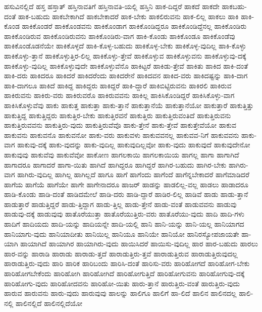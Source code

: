 {ಹಸುವಿನಲ್ಲಿದೆ
ಹಸ್ತ
ಹಸ್ತಾತ್
ಹಸ್ತಿನಾವತಿಗೆ
ಹಸ್ತಿನಾವತಿ-ಯಲ್ಲಿ
ಹಸ್ತಿನಿ
ಹಾಕ-ದಿದ್ದರೆ
ಹಾಕದೆ
ಹಾಕದೇ
ಹಾಕಬಹು-ದಂತೆ
ಹಾಕ-ಬಹುದು
ಹಾಕಬೇಕಾಗಿದೆ
ಹಾಕಬೇಕಾದರೆ
ಹಾಕ-ಬೇಕು
ಹಾಕಲಿರುವನು
ಹಾಕ-ಲಿಲ್ಲ
ಹಾಕಲು
ಹಾಕಿ
ಹಾಕಿ-ಕೊಂಡ
ಹಾಕಿಕೊಂಡರೆ
ಹಾಕಿಕೊಂಡವನು
ಹಾಕಿಕೊಂಡಾಗ
ಹಾಕಿಕೊಂಡಿದ್ದರೂ
ಹಾಕಿಕೊಂಡಿದ್ದೆನಲ್ಲ
ಹಾಕಿಕೊಂಡಿರು
ಹಾಕಿಕೊಂಡಿರುವ
ಹಾಕಿಕೊಂಡಿರುವನು
ಹಾಕಿಕೊಂಡಿರು-ವಾಗ
ಹಾಕಿ-ಕೊಂಡು
ಹಾಕಿಕೊಂಡೂ
ಹಾಕಿಕೊಂಡೆವು
ಹಾಕಿಕೊಂಡೊಡನೆಯೇ
ಹಾಕಿಕೊಳ್ಳದೆ
ಹಾಕಿ-ಕೊಳ್ಳ-ಬಹುದು
ಹಾಕಿಕೊಳ್ಳ-ಬೇಕು
ಹಾಕಿಕೊಳ್ಳ-ವುದಿಲ್ಲ
ಹಾಕಿ-ಕೊಳ್ಳು
ಹಾಕಿಕೊಳ್ಳು-ತ್ತಾನೆ
ಹಾಕಿಕೊಳ್ಳುತ್ತಿರ-ಲಿಲ್ಲ
ಹಾಕಿಕೊಳ್ಳು-ತ್ತೇವೆ
ಹಾಕಿಕೊಳ್ಳುವ
ಹಾಕಿಕೊಳ್ಳುವನು
ಹಾಕಿಕೊಳ್ಳುವು-ದಕ್ಕೆ
ಹಾಕಿಕೊಳ್ಳು-ವುದಿಲ್ಲ
ಹಾಕಿಕೊಳ್ಳುವುದೇ
ಹಾಕಿಕೊಳ್ಳುವೆನೊ
ಹಾಕಿಟ್ಟರೆ
ಹಾಕಿಡು-ತ್ತೇವೆ
ಹಾಕಿತು
ಹಾಕಿದ
ಹಾಕಿ-ದಂತೆ
ಹಾಕಿ-ದರು
ಹಾಕಿದರೂ
ಹಾಕಿದರೆ
ಹಾಕಿದರೆಂದು
ಹಾಕಿದರೇನೆ
ಹಾಕಿದವನ
ಹಾಕಿದ-ವರು
ಹಾಕಿದಷ್ಟನ್ನು
ಹಾಕಿ-ದಾಗ
ಹಾಕಿ-ದಾಗಲೂ
ಹಾಕಿದೆ
ಹಾಕಿದ್ದ
ಹಾಕಿದ್ದರು
ಹಾಕಿದ್ದರೆ
ಹಾಕಿ-ದ್ದಾರೆ
ಹಾಕಿಬಿಟ್ಟಿರುವನು
ಹಾಕಿರಲಿ
ಹಾಕಿರುವ
ಹಾಕಿರುವನು
ಹಾಕಿರು-ವರು
ಹಾಕಿರುವರೊ
ಹಾಕಿರುವವನು
ಹಾಕಿಲ್ಲ
ಹಾಕಿಸಿಕೊಂಡಿದ್ದರೆ
ಹಾಕಿಸಿಕೊಳ್ಳು-ವಾಗ
ಹಾಕಿಸಿಕೊಳ್ಳುವೆವು
ಹಾಕು
ಹಾಕುತ್ತ
ಹಾಕುತ್ತಾ
ಹಾಕು-ತ್ತಾನೆ
ಹಾಕುತ್ತಾನೆಯೆ
ಹಾಕುತ್ತಾನೆಯೋ
ಹಾಕುತ್ತಾರೆ
ಹಾಕುತ್ತಿತ್ತು
ಹಾಕುತ್ತಿದ್ದ
ಹಾಕುತ್ತಿದ್ದರು
ಹಾಕುತ್ತಿರ-ಬೇಕು
ಹಾಕುತ್ತಿರವನೆ
ಹಾಕುತ್ತಿರು
ಹಾಕುತ್ತಿರುವಂತಿದೆ
ಹಾಕುತ್ತಿರುವನು
ಹಾಕುತ್ತಿರುವವನು
ಹಾಕುತ್ತಿರು-ವುದು
ಹಾಕುತ್ತಿರುವೆವೊ
ಹಾಕು-ತ್ತೇನೆ
ಹಾಕು-ತ್ತೇವೆ
ಹಾಕುತ್ತೇವೆಯೋ
ಹಾಕುವ
ಹಾಕುವನು
ಹಾಕುವನೊ
ಹಾಕುವನೋ
ಹಾಕು-ವರು
ಹಾಕುವಳು
ಹಾಕುವವನಲ್ಲ
ಹಾಕುವವ-ನಿಗೆ
ಹಾಕುವವನು
ಹಾಕು-ವಾಗ
ಹಾಕುವು-ದಕ್ಕೆ
ಹಾಕು-ವುದನ್ನು
ಹಾಕು-ವುದಿಲ್ಲ
ಹಾಕುವುದಿಲ್ಲವೋ
ಹಾಕು-ವುದು
ಹಾಕುವುದೆ
ಹಾಕುವುದೇನೋ
ಹಾಕುವುವು
ಹಾಕುವೆವು
ಹಾಕುವೆವೋ
ಹಾಕೋಣ
ಹಾಗಲಕಾಯಿ
ಹಾಗಲಕಾಯಿಯ
ಹಾಗಲ್ಲ
ಹಾಗಾ
ಹಾಗಾಗಿದೆ
ಹಾಗಾದರೂ
ಹಾಗಾದರೆ
ಹಾಗಾ-ಯಿತು
ಹಾಗಿದೆ
ಹಾಗಿದ್ದರೂ
ಹಾಗಿದ್ದರೆ
ಹಾಗಿರ-ಬಹುದು
ಹಾಗಿರ-ಬೇಕು
ಹಾಗಿರು-ವಾಗ
ಹಾಗಿರು-ವುದಿಲ್ಲ
ಹಾಗಿಲ್ಲ
ಹಾಗಿಲ್ಲದೆ
ಹಾಗೂ
ಹಾಗೆ
ಹಾಗೆಂದು
ಹಾಗೆಂದೆ
ಹಾಗೆನ್ನಬೇಕಾದರೆ
ಹಾಗೆಮಾಡಿದರೆ
ಹಾಗೆಯ
ಹಾಗೆಯೆ
ಹಾಗೆಯೇ
ಹಾಗೇ
ಹಾಗೇನಾದರೂ
ಹಾಜರ್
ಹಾಡನ್ನು
ಹಾಡಲಿಲ್ಲ-ವಲ್ಲ
ಹಾಡಲು
ಹಾಡಾದರೂ
ಹಾಡಿ-ಕೊಂಡು
ಹಾಡಿ-ದಂತೆ
ಹಾಡಿದಮೇಲೆ
ಹಾಡಿ-ದರು
ಹಾಡಿ-ದ್ದಾರೆ
ಹಾಡಿರ-ಲಿಲ್ಲ
ಹಾಡಿವೆ
ಹಾಡು
ಹಾಡು-ತ್ತಾನೆ
ಹಾಡುತ್ತಾರೆ
ಹಾಡುತ್ತಿದ್ದರೆ
ಹಾಡು-ತ್ತಿದ್ದಾಗ
ಹಾಡು-ತ್ತಿಲ್ಲ
ಹಾಡು-ತ್ತೇನೆ
ಹಾಡು-ವಂತೆ
ಹಾಡುವವನು
ಹಾಡುವು
ಹಾಡುವು-ದಕ್ಕೆ
ಹಾಡುವುವು
ಹಾತೊರೆಯುತ್ತಾ
ಹಾತೊರೆಯುತ್ತಿರು-ವರು
ಹಾತೊರೆಯು-ವುದು
ಹಾದಿ
ಹಾದಿ-ಗಳು
ಹಾದಿಗೆ
ಹಾದಿಯದು
ಹಾದಿ-ಯನ್ನು
ಹಾದಿಯನ್ನೇ
ಹಾದಿ-ಯಲ್ಲಿ
ಹಾನಿ
ಹಾನಿ-ಯನ್ನು
ಹಾನಿ-ಯಲ್ಲ
ಹಾನಿಯಾಗದ
ಹಾನಿಯಾಗು-ವುದು
ಹಾನಿಯಾದೀತು
ಹಾನಿಯಿಲ್ಲ
ಹಾನಿಯೂ
ಹಾನಿಯೇ
ಹಾನಿಯೋ
ಹಾನಿರಸ್ಯೋಪಜಾಯತೇ
ಹಾ-ಯಾಗಿ
ಹಾಯಾಗಿದೆ
ಹಾಯಾಗಿರ
ಹಾಯಾಗಿರು-ವುದು
ಹಾಯಿಸಿದರೆ
ಹಾಯಿಸು-ವುದಿಲ್ಲ
ಹಾರ
ಹಾರ-ಬಹುದು
ಹಾರಲು
ಹಾರ-ವನ್ನು
ಹಾರಾಡಿ
ಹಾರಾಡು
ಹಾರಾಡು-ತ್ತದೆ
ಹಾರಾಡುತ್ತಿರು-ತ್ತವೆ
ಹಾರಾಡುತ್ತಿರುವ
ಹಾರಾಡುತ್ತಿರುವುದಲ್ಲ
ಹಾರಾಡುತ್ತಿರು-ವುದು
ಹಾರಿ
ಹಾರಿಕ
ಹಾರಿಬಂದು
ಹಾರಿಸಿ-ದಂತೆ
ಹಾರಿಸು-ವರು
ಹಾರಿಹೋಗದೆ
ಹಾರಿಹೋಗ-ಬೇಕು
ಹಾರಿಹೋಗಬೇಕೆಂದು
ಹಾರಿಹೋಗಿ
ಹಾರಿಹೋಗಿದೆ
ಹಾರಿಹೋಗುತ್ತಿದೆ
ಹಾರಿಹೋಗುವನು
ಹಾರಿಹೋಗುವು-ದಕ್ಕೆ
ಹಾರಿಹೋಗು-ವುದು
ಹಾರಿಹೋದವನು
ಹಾರಿಹೋ-ಯಿತು
ಹಾರು-ತ್ತಾನೆ
ಹಾರುತ್ತಿರು-ವಂತೆ
ಹಾರುತ್ತಿರು-ವುದು
ಹಾರುವ
ಹಾರುವನು
ಹಾರು-ವುದು
ಹಾರುವುವು
ಹಾಲನ್ನು
ಹಾಲಿಗೂ
ಹಾಲಿಗೆ
ಹಾ-ಲಿದೆ
ಹಾಲಿನ
ಹಾಲಿನದಲ್ಲ
ಹಾಲಿ-ನಲ್ಲಿ
ಹಾಲಿನಲ್ಲಿದೆ
ಹಾಲಿನಲ್ಲಿದೆಯೋ
}
